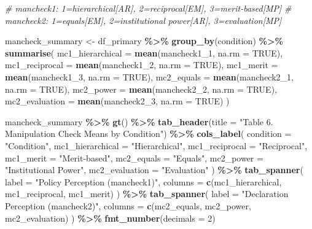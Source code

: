 \documentclass[
]{article}
\newenvironment{Shaded}{\begin{snugshade}}{\end{snugshade}}
\newcommand{\AttributeTok}[1]{\textcolor[rgb]{0.13,0.29,0.53}{#1}}
\newcommand{\CommentTok}[1]{\textcolor[rgb]{0.56,0.35,0.01}{\textit{#1}}}
\newcommand{\ConstantTok}[1]{\textcolor[rgb]{0.56,0.35,0.01}{#1}}
\newcommand{\DecValTok}[1]{\textcolor[rgb]{0.00,0.00,0.81}{#1}}
\newcommand{\FunctionTok}[1]{\textcolor[rgb]{0.13,0.29,0.53}{\textbf{#1}}}
\newcommand{\NormalTok}[1]{#1}
\newcommand{\OtherTok}[1]{\textcolor[rgb]{0.56,0.35,0.01}{#1}}
\newcommand{\SpecialCharTok}[1]{\textcolor[rgb]{0.81,0.36,0.00}{\textbf{#1}}}
\newcommand{\StringTok}[1]{\textcolor[rgb]{0.31,0.60,0.02}{#1}}
\begin{document}
\begin{Shaded}
\begin{Highlighting}[]
\CommentTok{\# mancheck1: 1=hierarchical[AR], 2=reciprocal[EM], 3=merit{-}based[MP]}
\CommentTok{\# mancheck2: 1=equals[EM], 2=institutional power[AR], 3=evaluation[MP]}

\NormalTok{mancheck\_summary }\OtherTok{\textless{}{-}}\NormalTok{ df\_primary }\SpecialCharTok{\%\textgreater{}\%}
  \FunctionTok{group\_by}\NormalTok{(condition) }\SpecialCharTok{\%\textgreater{}\%}
  \FunctionTok{summarise}\NormalTok{(}
    \AttributeTok{mc1\_hierarchical =} \FunctionTok{mean}\NormalTok{(mancheck1\_1, }\AttributeTok{na.rm =} \ConstantTok{TRUE}\NormalTok{),}
    \AttributeTok{mc1\_reciprocal   =} \FunctionTok{mean}\NormalTok{(mancheck1\_2, }\AttributeTok{na.rm =} \ConstantTok{TRUE}\NormalTok{),}
    \AttributeTok{mc1\_merit        =} \FunctionTok{mean}\NormalTok{(mancheck1\_3, }\AttributeTok{na.rm =} \ConstantTok{TRUE}\NormalTok{),}
    \AttributeTok{mc2\_equals       =} \FunctionTok{mean}\NormalTok{(mancheck2\_1, }\AttributeTok{na.rm =} \ConstantTok{TRUE}\NormalTok{),}
    \AttributeTok{mc2\_power        =} \FunctionTok{mean}\NormalTok{(mancheck2\_2, }\AttributeTok{na.rm =} \ConstantTok{TRUE}\NormalTok{),}
    \AttributeTok{mc2\_evaluation   =} \FunctionTok{mean}\NormalTok{(mancheck2\_3, }\AttributeTok{na.rm =} \ConstantTok{TRUE}\NormalTok{)}
\NormalTok{  )}

\NormalTok{mancheck\_summary }\SpecialCharTok{\%\textgreater{}\%}
  \FunctionTok{gt}\NormalTok{() }\SpecialCharTok{\%\textgreater{}\%}
  \FunctionTok{tab\_header}\NormalTok{(}\AttributeTok{title =} \StringTok{"Table 6. Manipulation Check Means by Condition"}\NormalTok{) }\SpecialCharTok{\%\textgreater{}\%}
  \FunctionTok{cols\_label}\NormalTok{(}
    \AttributeTok{condition        =} \StringTok{"Condition"}\NormalTok{,}
    \AttributeTok{mc1\_hierarchical =} \StringTok{"Hierarchical"}\NormalTok{,}
    \AttributeTok{mc1\_reciprocal   =} \StringTok{"Reciprocal"}\NormalTok{,}
    \AttributeTok{mc1\_merit        =} \StringTok{"Merit{-}based"}\NormalTok{,}
    \AttributeTok{mc2\_equals       =} \StringTok{"Equals"}\NormalTok{,}
    \AttributeTok{mc2\_power        =} \StringTok{"Institutional Power"}\NormalTok{,}
    \AttributeTok{mc2\_evaluation   =} \StringTok{"Evaluation"}
\NormalTok{  ) }\SpecialCharTok{\%\textgreater{}\%}
  \FunctionTok{tab\_spanner}\NormalTok{(}
    \AttributeTok{label =} \StringTok{"Policy Perception (mancheck1)"}\NormalTok{,}
    \AttributeTok{columns =} \FunctionTok{c}\NormalTok{(mc1\_hierarchical, mc1\_reciprocal, mc1\_merit)}
\NormalTok{  ) }\SpecialCharTok{\%\textgreater{}\%}
  \FunctionTok{tab\_spanner}\NormalTok{(}
    \AttributeTok{label =} \StringTok{"Declaration Perception (mancheck2)"}\NormalTok{,}
    \AttributeTok{columns =} \FunctionTok{c}\NormalTok{(mc2\_equals, mc2\_power, mc2\_evaluation)}
\NormalTok{  ) }\SpecialCharTok{\%\textgreater{}\%}
  \FunctionTok{fmt\_number}\NormalTok{(}\AttributeTok{decimals =} \DecValTok{2}\NormalTok{)}
\end{Highlighting}
\end{Shaded}
\end{document}
